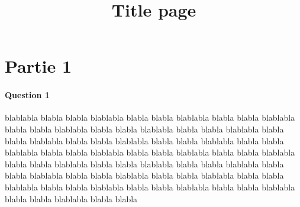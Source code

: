 \documentclass{TPProf}
\title{Title page}
\begin{document}

\fairepagedegarde %
\tabledematieres %


\newpage

\section{Partie 1}

\paragraph{Question 1} 

blablabla blabla blabla blablabla blabla blabla blablabla blabla blabla blablabla blabla blabla blablabla blabla blabla blablabla blabla blabla blablabla blabla blabla blablabla blabla blabla blablabla blabla blabla blablabla blabla blabla blablabla blabla blabla blablabla blabla blabla blablabla blabla blabla blablabla blabla blabla blablabla blabla blabla blablabla blabla blabla blablabla blabla blabla blablabla blabla blabla blablabla blabla blabla blablabla blabla blabla blablabla blabla blabla blablabla blabla blabla blablabla blabla blabla blablabla blabla blabla blablabla blabla blabla 
\end{document}

